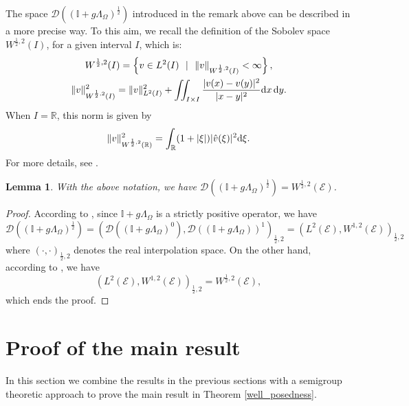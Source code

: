 \documentclass{amsart} %
\numberwithin{equation}{section}
\newtheorem{lemma}[theorem]{Lemma}
\theoremstyle{definition}
\begin{document}
The space $\mathcal{D}((\mathbb{I}+g\Lambda_{\Omega})^{\frac12})$ introduced in the remark above can be described in a more precise way. To this aim, we recall the definition of the Sobolev space $W^{\frac12,2}(I)$, for a given interval $I$, which is:
\begin{gather}
W^{\frac12,2}(I)=\left\{v\in L^2(I) \ \ | \ \ \|v\|_{W^{\frac12,2}(I)}<\infty\right\},\\
\|v\|_{W^{\frac12,2}(I)}^2=\|v\|_{L^2(I)}^2+\iint_{I\times I}\frac{|v(x)-v(y)|^2}{|x-y|^2}{\rm d}x\,{\rm d}y.
\end{gather}
When $I=\mathbb{R}$, this norm is given by
\begin{equation}
\|v\|_{W^{\frac12,2}(\mathbb{R})}^2=\int_{\mathbb{R}}(1+|\xi|)|\hat v(\xi)|^2{\rm d}\xi.   
\end{equation}
For more details, see \cite{brezis2010functional,lions2012non}.
\begin{lemma}\label{Domain_12}
With the above notation, we have $\mathcal{D}((\mathbb{I}+g\Lambda_{\Omega})^{\frac12})=W^{\frac12,2}(\mathcal{E})$.
\end{lemma}
\begin{proof}
According to \cite[Theorem 4.36]{lunardi2018interpolation}, since $\mathbb{I}+g\Lambda_{\Omega}$ is a strictly positive operator, we have
\begin{equation}
    \mathcal{D}((\mathbb{I}+g\Lambda_{\Omega})^{\frac12})=(\mathcal{D}((\mathbb{I}+g\Lambda_{\Omega})^0),\mathcal{D}((\mathbb{I}+g\Lambda_{\Omega}))^1)_{\frac12,2}=(L^2(\mathcal{E}),W^{1,2}(\mathcal{E}))_{\frac12,2}
\end{equation}
where $(\cdot,\cdot)_{\frac12,2}$ denotes the real interpolation space. On the other hand, according to \cite[Theorem B.8]{mclean2000strongly}, we have
\begin{equation}
    (L^2(\mathcal{E}),W^{1,2}(\mathcal{E}))_{\frac12,2}=W^{\frac12,2}(\mathcal{E}),
\end{equation}
which ends the proof.
\end{proof}
\section{Proof of the main result}\label{sec_coupling}
In this section we combine the results in the previous sections with a semigroup theoretic approach to prove the main result in Theorem \ref{well_posedness}.
\end{document}
